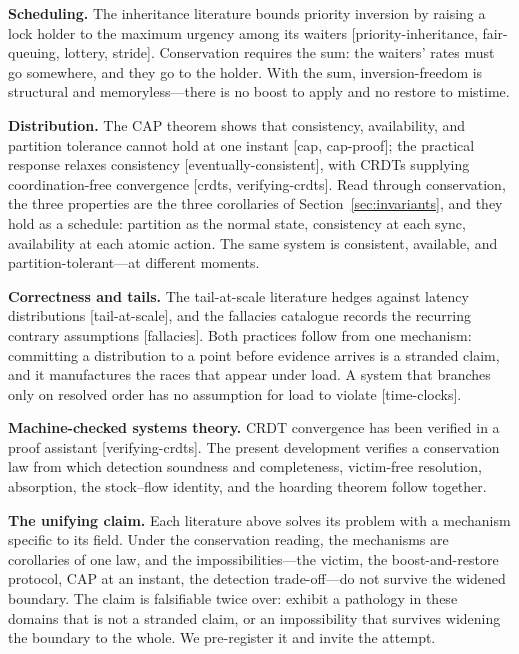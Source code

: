 \documentclass[11pt]{article}
\begin{document}
\textbf{Scheduling.} The inheritance literature bounds priority
inversion by raising a lock holder to the maximum urgency among its
waiters [priority-inheritance, fair-queuing, lottery, stride].
Conservation requires the sum: the waiters' rates must go somewhere,
and they go to the holder. With the sum, inversion-freedom is
structural and memoryless---there is no boost to apply and no restore
to mistime.

\textbf{Distribution.} The CAP theorem shows that consistency,
availability, and partition tolerance cannot hold at one instant
[cap, cap-proof]; the practical response relaxes consistency
[eventually-consistent], with CRDTs supplying coordination-free
convergence [crdts, verifying-crdts]. Read through conservation, the
three properties are the three corollaries of
Section~\ref{sec:invariants}, and they hold as a schedule: partition
as the normal state, consistency at each sync, availability at each
atomic action. The same system is consistent, available, and
partition-tolerant---at different moments.

\textbf{Correctness and tails.} The tail-at-scale literature hedges
against latency distributions [tail-at-scale], and the fallacies
catalogue records the recurring contrary assumptions [fallacies].
Both practices follow from one mechanism: committing a distribution
to a point before evidence arrives is a stranded claim, and it
manufactures the races that appear under load. A system that branches
only on resolved order has no assumption for load to violate
[time-clocks].

\textbf{Machine-checked systems theory.} CRDT convergence has been
verified in a proof assistant [verifying-crdts]. The present development verifies a conservation law from which
detection soundness and completeness, victim-free resolution,
absorption, the stock--flow identity, and the hoarding theorem follow
together.

\textbf{The unifying claim.} Each literature above solves its problem
with a mechanism specific to its field. Under the conservation
reading, the mechanisms are corollaries of one law, and the
impossibilities---the victim, the boost-and-restore protocol, CAP at
an instant, the detection trade-off---do not survive the widened
boundary. The claim is falsifiable twice over: exhibit a pathology in
these domains that is not a stranded claim, or an impossibility that
survives widening the boundary to the whole. We pre-register it and
invite the attempt.

\end{document}
